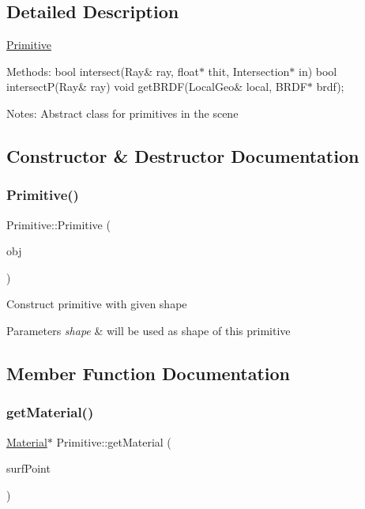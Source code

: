 \subsection{Detailed Description}
\mbox{\hyperlink{class_primitive}{Primitive}}

Methods\+: bool intersect(\+Ray\& ray, float$\ast$ thit, Intersection$\ast$ in) bool intersect\+P(\+Ray\& ray) void get\+B\+R\+D\+F(\+Local\+Geo\& local, B\+R\+D\+F$\ast$ brdf);

Notes\+: Abstract class for primitives in the scene 

\subsection{Constructor \& Destructor Documentation}
\mbox{\label{class_primitive_aa469be6577bcf2c249a47c6e44608155}} 
\subsubsection{\texorpdfstring{Primitive()}{Primitive()}}
{\footnotesize\ttfamily Primitive\+::\+Primitive (\begin{DoxyParamCaption}\item[{\mbox{\hyperlink{class_shape}{Shape}} $\ast$}]{obj }\end{DoxyParamCaption})\hspace{0.3cm}{\ttfamily [inline]}}

Construct primitive with given shape 
\begin{DoxyParams}{Parameters}
{\em shape} & will be used as shape of this primitive \\
\hline
\end{DoxyParams}


\subsection{Member Function Documentation}
\mbox{\label{class_primitive_acf807003abb52d3224dda7a476f71d96}} 
\subsubsection{\texorpdfstring{get\+Material()}{getMaterial()}}
{\footnotesize\ttfamily \mbox{\hyperlink{class_material}{Material}}$\ast$ Primitive\+::get\+Material (\begin{DoxyParamCaption}\item[{const \mbox{\hyperlink{class_surface_point}{Surface\+Point}} \&}]{surf\+Point }\end{DoxyParamCaption})\hspace{0.3cm}{\ttfamily [inline]}}

